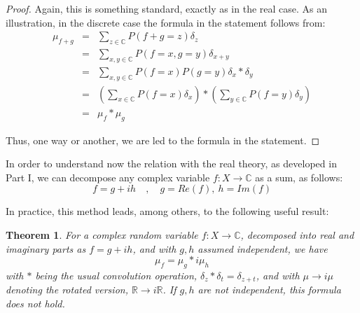 \documentclass[12pt]{amsbook}
\newtheorem{theorem}{Theorem}[chapter]
\begin{document}
\begin{proof}
Again, this is something standard, exactly as in the real case. As an illustration, in the discrete case the formula in the statement follows from:
\begin{eqnarray*}
\mu_{f+g}
&=&\sum_{z\in\mathbb C}P(f+g=z)\delta_z\\
&=&\sum_{x,y\in\mathbb C}P(f=x,g=y)\delta_{x+y}\\
&=&\sum_{x,y\in\mathbb C}P(f=x)P(g=y)\delta_x*\delta_y\\
&=&\left(\sum_{x\in\mathbb C}P(f=x)\delta_x\right)*\left(\sum_{y\in\mathbb C}P(f=y)\delta_y\right)\\
&=&\mu_f*\mu_g
\end{eqnarray*}

Thus, one way or another, we are led to the formula in the statement.
\end{proof}

In order to understand now the relation with the real theory, as developed in Part I, we can decompose any complex variable $f:X\to\mathbb C$ as a sum, as follows:
$$f=g+ih\quad,\quad g=Re(f),\ h=Im(f)$$

In practice, this method leads, among others, to the following useful result:


\begin{theorem}
For a complex random variable $f:X\to\mathbb C$, decomposed into real and imaginary parts as $f=g+ih$, and with $g,h$ assumed independent, we have
$$\mu_f=\mu_g*i\mu_h$$
with $*$ being the usual convolution operation, $\delta_z*\delta_t=\delta_{z+t}$, and with $\mu\to i\mu$ denoting the rotated version, $\mathbb R\to i\mathbb R$. If $g,h$ are not independent, this formula does not hold.
\end{theorem}
\end{document}
